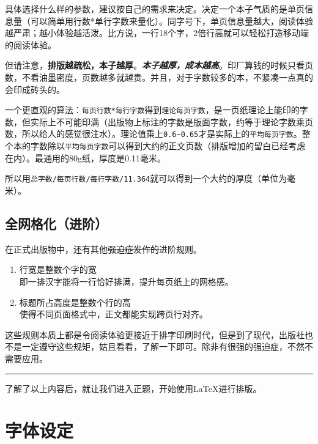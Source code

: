 \documentclass[10pt,openany]{book}
\newenvironment{tightenum}
{\begin{enumerate}[topsep=0pt,partopsep=0pt,itemsep=0pt,parsep=0pt,leftmargin=3\ccwd,labelwidth=1.5\ccwd,labelsep=.5\ccwd]}
        {\end{enumerate}}
\begin{document}
\blankpar

具体选择什么样的参数，建议按自己的需求来决定。决定一个本子气质的是单页信息量（可以简单用行数*单行字数来量化）。同字号下，单页信息量越大，阅读体验越严肃；越小体验越活泼。比方说，一行18个字，2倍行高就可以轻松打造移动端的阅读体验。

但请注意，\textbf{排版越疏松，本子越厚}。\emph{\textbf{本子越厚，成本越高}}。印厂算钱的时候只看页数，不看油墨密度，页数越多就越贵。并且，对于字数较多的本，不紧凑一点真的会印成砖头的。

一个更直观的算法：\texttt{每页行数*每行字数}得到\texttt{理论每页字数}，是一页纸理论上能印的字数，但实际上不可能印满（出版物上标注的字数是版面字数，约等于理论字数乘页数，所以给人的感觉很注水）。理论值乘上\texttt{0.6\textasciitilde{}0.65}才是实际上的\texttt{平均每页字数}。整个本的字数除以\texttt{平均每页字数}可以得到大约的正文页数（排版增加的留白已经考虑在内）。最通用的80g纸，厚度是0.11毫米。

所以用\texttt{总字数/每页行数/每行字数/11.364}就可以得到一个大约的厚度（单位为毫米）。

\section{全网格化（进阶）}

在正式出版物中，还有其他\sout{强迫症发作的}进阶规则。

\begin{tightenum}
    \item   行宽是整数个字的宽\\即一排汉字能将一行恰好排满，提升每页纸上的网格感。
    \item   标题所占高度是整数个行的高\\使得不同页面格式中，正文都能实现跨页行对齐。
\end{tightenum}

这些规则本质上都是令阅读体验更接近于排字印刷时代，但是到了现代，出版社也不是一定遵守这些规矩，姑且看看，了解一下即可。除非有很强的强迫症，不然不需要应用。

\begin{center}\rule{0.5\linewidth}{0.5pt}\end{center}

了解了以上内容后，就让我们进入正题，开始使用\LaTeX 进行排版。

\chapter{字体设定}
\end{document}
